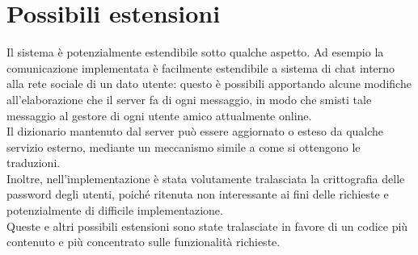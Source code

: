 \documentclass[10pt]{article}
\begin{document}
{\section{Possibili estensioni}
Il sistema è potenzialmente estendibile sotto qualche aspetto. Ad esempio la comunicazione implementata è facilmente estendibile a sistema di chat interno alla rete sociale di un dato utente: questo è possibili apportando alcune modifiche all'elaborazione che il server fa di ogni messaggio, in modo che smisti tale messaggio al gestore di ogni utente amico attualmente online.\\
Il dizionario mantenuto dal server può essere aggiornato o esteso da qualche servizio esterno, mediante un meccanismo simile a come si ottengono le traduzioni.\\
Inoltre, nell'implementazione è stata volutamente tralasciata la crittografia delle password degli utenti, poiché ritenuta non interessante ai fini delle richieste e potenzialmente di difficile implementazione.\\
Queste e altri possibili estensioni sono state tralasciate in favore di un codice più contenuto e più concentrato sulle funzionalità richieste.
}
\end{document}
